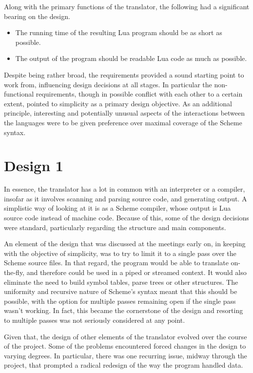 Along with the primary functions of the translator, the following had a
significant bearing on the design.
\begin{itemize}
\item The running time of the resulting Lua program should be as short as
possible.
\item The output of the program should be readable Lua code as much as possible.
\end{itemize}

Despite being rather broad, the requirements provided a sound starting point to
work from, influencing design decisions at all stages. In particular the
non-functional requirements, though in possible conflict with each other to a
certain extent, pointed to simplicity as a primary design objective. As an
additional principle, interesting and potentially unusual aspects of the
interactions between the languages were to be given preference over maximal
coverage of the Scheme syntax.


\section{Design 1}

In essence, the translator has a lot in common with an interpreter or a
compiler, insofar as it involves scanning and parsing source code, and
generating output. A simplistic way of looking at it is as a Scheme compiler,
whose output is Lua source code instead of machine code. Because of this, some
of the design decisions were standard, particularly regarding the structure and
main components.

An element of the design that was discussed at the meetings early on, in keeping
with the objective of simplicity, was to try to limit it to a single pass over
the Scheme source files. In that regard, the program would be able to translate
on-the-fly, and therefore could be used in a piped or streamed context. It would
also eliminate the need to build symbol tables, parse trees or other structures.
The uniformity and recursive nature of Scheme's syntax meant that this should be
possible, with the option for multiple passes remaining open if the single pass
wasn't working. In fact, this became the cornerstone of the design and resorting
to multiple passes was not seriously considered at any point.

Given that, the design of other elements of the translator evolved over the
course of the project. Some of the problems encountered forced changes in the
design to varying degrees. In particular, there was one recurring issue, midway
through the project, that prompted a radical redesign of the way the program
handled data.

